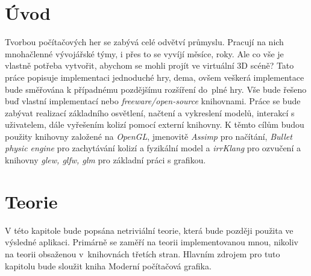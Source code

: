 
\chapter{Úvod}
Tvorbou počítačových her se zabývá celé odvětví průmyslu. Pracují na nich mnohačlenné vývojářské týmy, i přes to se vyvíjí měsíce, roky. Ale co vše je vlastně  potřeba vytvořit, abychom se mohli projít ve virtuální 3D scéně? Tato práce popisuje implementaci jednoduché hry, dema, ovšem veškerá implementace bude směřována k případnému pozdějšímu rozšíření do~plné hry. Vše bude řešeno buď vlastní implementací nebo \emph{freeware/open-source} knihovnami.
Práce se bude zabývat realizací základního osvětlení, načtení a vykreslení modelů, interakcí s uživatelem, dále vyřešením kolizí pomocí externí knihovny. K těmto cílům budou použity knihovny založené na \emph{OpenGL}, jmenovitě \emph{Assimp}\cite{assimp} pro načítání, \emph{Bullet physic engine}\cite{bullet} pro zachytávání kolizí a fyzikální model a \emph{irrKlang}\cite{irrKlang} pro ozvučení a knihovny \emph{glew\cite{glew}, glfw\cite{glfw}, glm\cite{glm}} pro základní práci s grafikou.           

\chapter{Teorie}
V této kapitole bude popsána netriviální teorie, která bude později použita ve výsledné aplikaci. Primárně se zaměří na teorii implementovanou mnou, nikoliv na teorii obsaženou v~knihovnách třetích stran. Hlavním zdrojem pro tuto kapitolu bude sloužit kniha Moderní počítačová grafika\cite{MPGBook}. 
